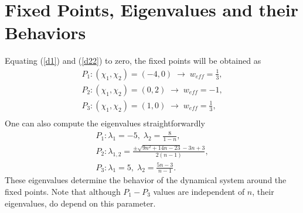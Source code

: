 \documentclass[a4paper,11pt]{article}
\begin{document}
\section{Fixed Points,  Eigenvalues and their Behaviors}
Equating (\ref{d1}) and (\ref{d22}) to zero, the fixed points will be obtained as 
\begin{align*}
P_1: (\chi_1,\chi_2)=(-4,0)\; \longrightarrow\; w_{eff}=\frac{1}{3}, \\ 
P_2: (\chi_1,\chi_2)=(0,2)\; \longrightarrow\; w_{eff}=-1, \\
P_3: (\chi_1,\chi_2)=(1,0)\; \longrightarrow\; w_{eff}=\frac{1}{3}, \\
\end{align*} 
One can also compute the eigenvalues straightforwardly
\begin{align*}
P_1: \lambda_1=-5,\; \lambda_2=\frac{8}{1-n},\\
P_2: \lambda_{1,2}=\frac{\pm\sqrt{9 n^2+14 n-23}-3 n+3}{2 (n-1)},\\
P_3: \lambda_1=5,\; \lambda_2=\frac{5n-3}{n-1}.
\end{align*}
These eigenvalues determine the behavior of the dynamical system around the fixed points. Note that although $P_1-P_3$ values are independent of $n$, their eigenvalues, do depend on this parameter.
\end{document}
